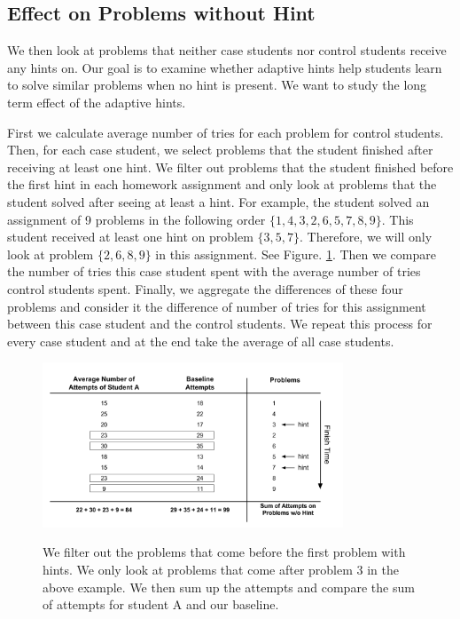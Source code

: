\documentclass{llncs}
\begin{document}
\subsection{Effect on Problems without Hint}
We then look at problems that neither case students nor control students receive any hints on. Our goal is to examine whether adaptive hints help students learn to solve similar problems when no hint is present. We want to study the long term effect of the adaptive hints.

First we calculate average number of tries for each problem for control students. Then, for each case student, we select problems that the student finished after receiving at least one hint. We filter out problems that the student finished before the first hint in each homework assignment and only look at problems that the student solved after seeing at least a hint. For example, the student solved an assignment of 9 problems in the following order $\{ 1, 4, 3, 2, 6, 5, 7, 8, 9\}$. This student received at least one hint on problem $\{3, 5, 7\}$. Therefore, we will only look at problem $\{2, 6, 8, 9\}$ in this assignment. See Figure. \ref{fig:pro_no_hint}. Then we compare the number of tries this case student spent with the average number of tries control students spent. Finally, we aggregate the differences of these four problems and consider it the difference of number of tries for this assignment between this case student and the control students. We repeat this process for every case student and at the end take the average of all case students.

\begin{figure}[ht]
   \centering
   \caption{We filter out the problems that come before the first problem with hints. We only look at problems that come after problem 3 in the above example. We then sum up the attempts and compare the sum of attempts for student A and our baseline.}
   \includegraphics[width=0.8\textwidth]{image/Filter_problems.png}
   \label{fig:pro_no_hint}
\end{figure}
\end{document}
